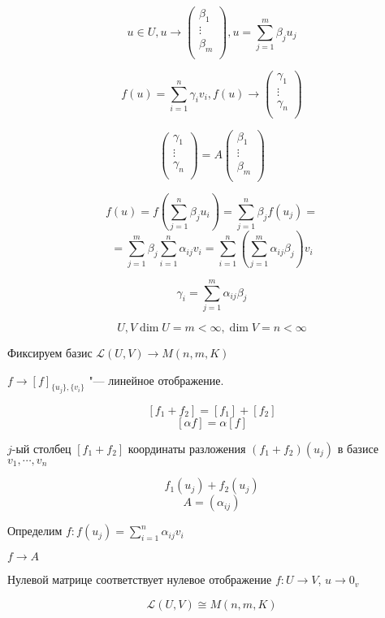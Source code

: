 \begin{Rem}
$$u \in U, u \to 
\begin{pmatrix}
\beta_1\\
\vdots\\
\beta_m\\
\end{pmatrix}, u = \sum_{j = 1}^{m}\beta_{j}u_{j}$$

$$f(u) = \sum_{i = 1}^{n}\gamma_{i}v_{i}, f(u) \to 
\begin{pmatrix}
\gamma_1\\
\vdots\\
\gamma_n\\
\end{pmatrix}$$

$$
\begin{pmatrix}
\gamma_1\\
\vdots\\
\gamma_n\\
\end{pmatrix}
= A
\begin{pmatrix}
\beta_1\\
\vdots\\
\beta_m\\
\end{pmatrix} 
$$

$$f(u) = f(\sum_{j = 1}^{n}\beta_ju_i) = \sum_{j = 1}^{n}\beta_{j}f(u_j) = $$
$$= \sum_{j = 1}^{m}\beta_j \sum_{i = 1}^{n}\alpha_{ij}v_i = \sum_{i = 1}^{n}(\sum_{j = 1}^{m}\alpha_{ij}\beta_{j}) v_{i}$$

$$\gamma_{i} = \sum_{j = 1}^{m}\alpha_{ij}\beta_{j}$$
\end{Rem}
$$U, V \dim U = m < \infty, \dim V = n < \infty$$

Фиксируем базис 
$\mathcal{L}(U, V) \to M(n, m, K)$

$f \to [f]_{\{u_{j}\}, \{v_{i}\}}$ "--- линейное отображение.

$$[f_1 + f_2] = [f_1] + [f_2]$$
$$[\alpha f] = \alpha[f]$$
 
$j$-ый столбец $[f_1 + f_2]$ координаты разложения $(f_1 + f_2)(u_j)$ в базисе $v_1, \cdots, v_n$

$$f_1(u_j) + f_2(u_j)$$
$$A = (\alpha_{ij}) $$
                       
Определим $f \colon f(u_j) = \sum_{i = 1}^{n}\alpha_{ij}v_i$

$f \to A$

Нулевой матрице соответствует нулевое отображение $f \colon U \to V$, $u \to 0_v$

\begin{conseq}
$$\mathcal{L}(U, V) \cong M(n, m, K)$$
\end{conseq}